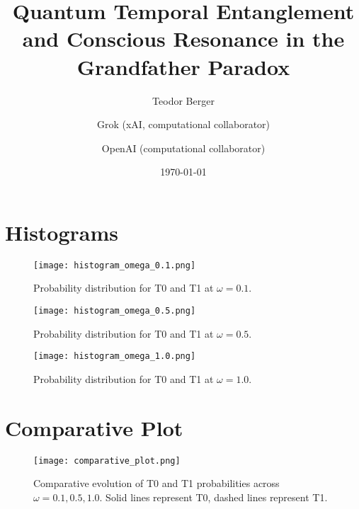 \section{Histograms}
\begin{figure}[h]
\centering
\texttt{[image: histogram\_omega\_0.1.png]}
\caption{Probability distribution for T0 and T1 at $\omega = 0.1$.}
\label{fig:hist_0.1}
\end{figure}
\begin{figure}[h]
\centering
\texttt{[image: histogram\_omega\_0.5.png]}
\caption{Probability distribution for T0 and T1 at $\omega = 0.5$.}
\label{fig:hist_0.5}
\end{figure}
\begin{figure}[h]
\centering
\texttt{[image: histogram\_omega\_1.0.png]}
\caption{Probability distribution for T0 and T1 at $\omega = 1.0$.}
\label{fig:hist_1.0}
\end{figure}

\section{Comparative Plot}
\begin{figure}[h]
\centering
\texttt{[image: comparative\_plot.png]}
\caption{Comparative evolution of T0 and T1 probabilities across $\omega = 0.1, 0.5, 1.0$. Solid lines represent T0, dashed lines represent T1.}
\label{fig:comparative}
\end{figure}


\documentclass[a4paper,12pt]{article}
\usepackage[utf8]{inputenc}
\usepackage{amsmath, amssymb, amsfonts}
\usepackage{graphicx}
\usepackage{hyperref}
\usepackage{geometry}
\geometry{a4paper, margin=1in}

\title{Quantum Temporal Entanglement and Conscious Resonance in the Grandfather Paradox}
\author{Teodor Berger \and Grok (xAI, computational collaborator) \and OpenAI (computational collaborator)}
\date{\today}



\maketitle

\begin{abstract}
The grandfather paradox poses a profound challenge to causality in time travel scenarios. The Mental-Experimental Prototype 1 (MEP1) introduces a novel resolution through quantum temporal entanglement, modeling conscious intention as a phase $\phi(C) = \pi \sin(\omega t)$ within a 3-qubit quantum circuit. By simulating timeline bifurcation between the original (T0, $|100\rangle$) and alternate (T1, $|011\rangle$) timelines, MEP1 reveals a quantum heating mechanism driven by bioentanglement and vacuum fluctuations. Our findings suggest that conscious control modulates probabilistic outcomes, offering new perspectives on quantum gravity, temporal mechanics, and the ontology of choice.
\end{abstract}

